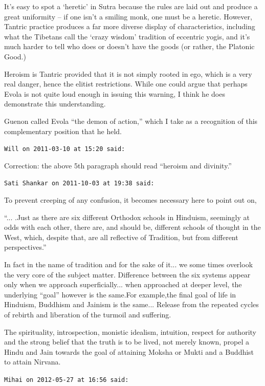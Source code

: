 \begin{footnotesize}
\begin{sffamily}
It's easy to spot a `heretic' in Sutra because the rules are laid out and produce a great uniformity -- if one isn't a smiling monk, one must be a heretic. However, Tantric practice produces a far more diverse display of characteristics, including what the Tibetans call the `crazy wisdom' tradition of eccentric yogis, and it's much harder to tell who does or doesn't have the goods (or rather, the Platonic Good.)

Heroism is Tantric provided that it is not simply rooted in ego, which is a very real danger, hence the elitist restrictions. While one could argue that perhaps Evola is not quite loud enough in issuing this warning, I think he does demonstrate this understanding.

Guenon called Evola ``the demon of action,'' which I take as a recognition of this complementary position that he held.

\hfill

\texttt{Will on 2011-03-10 at 15:20 said:}

Correction: the above 5th paragraph should read ``heroism and divinity.''

\hfill

\texttt{Sati Shankar on 2011-10-03 at 19:38 said:}

To prevent creeping of any confusion, it becomes necessary here to point out on,

``... .Just as there are six different Orthodox schools in Hinduism, seemingly at odds with each other, there are, and should be, different schools of thought in the West, which, despite that, are all reflective of Tradition, but from different perspectives.''

In fact in the name of tradition and for the sake of it... we some times overlook the very core of the subject matter. Difference between the six systems appear only when we approach superficially... when approached at deeper level, the underlying ``goal'' however is the same.For example,the final goal of life in Hinduism, Buddhism and Jainism is the same... Release from the repeated cycles of rebirth and liberation of the turmoil and suffering.

The spirituality, introspection, monistic idealism, intuition, respect for authority and the strong belief that the truth is to be lived, not merely known, propel a Hindu and Jain towards the goal of attaining Moksha or Mukti and a Buddhist to attain Nirvana.

\hfill

\texttt{Mihai on 2012-05-27 at 16:56 said:}


\end{sffamily}
\end{footnotesize}
